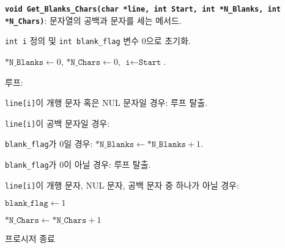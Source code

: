 \documentclass[runningheads]{../../../llncs}
\begin{document}
\textbf{\texttt{void Get_Blanks_Chars(char *line, int Start, int *N_Blanks, int *N_Chars)}}: 문자열의 공백과 문자를 세는 메서드.
\begin{algorithm}
	\item \texttt{int i} 정의 및 \texttt{int blank_flag} 변수 0으로 초기화.
	\item $\texttt{*N_Blanks} \leftarrow 0$, $\texttt{*N_Chars} \leftarrow 0$, $\texttt{i} \leftarrow \texttt{Start}$.
	\item 루프:
			\begin{algorithm}
				\item \texttt{line[i]}이 개행 문자 혹은 NUL 문자일 경우: 루프 탈출.
				\item \texttt{line[i]}이 공백 문자일 경우:
					\begin{algorithm}
						\item \texttt{blank_flag}가 0일 경우: $\texttt{*N_Blanks} \leftarrow \texttt{*N_Blanks} + 1$.
						\item \texttt{blank_flag}가 0이 아닐 경우: 루프 탈출.
 					\end{algorithm}
				\item \texttt{line[i]}이 개행 문자, NUL 문자, 공백 문자 중 하나가 아닐 경우:
					\begin{algorithm}
						\item $\texttt{blank_flag} \leftarrow 1$
						\item $\texttt{*N_Chars} \leftarrow \texttt{*N_Chars} + 1$
 					\end{algorithm}
			\end{algorithm} 
	\item 프로시저 종료
\end{algorithm}
\end{document}

